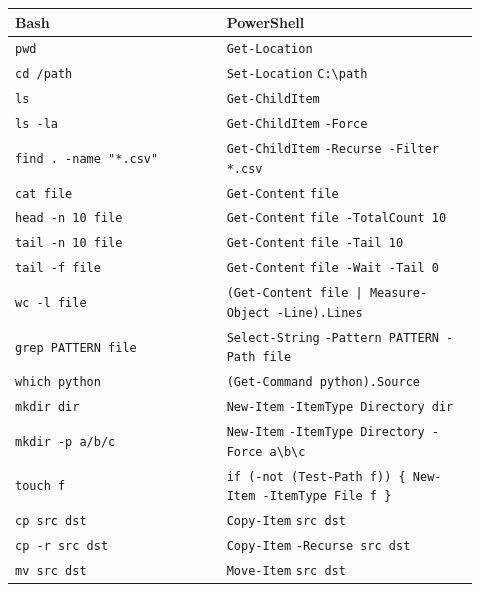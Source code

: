 \documentclass[11pt,a4paper]{article}
\newcommand{\cmd}[1]{\texttt{\textcolor{pwshKw}{#1}}}
\newcommand{\bcmd}[1]{\texttt{\textcolor{bashKw}{#1}}}
\begin{document}
\begin{center}
\renewcommand{\arraystretch}{1.15}
\begin{tabular}{p{0.42\linewidth} p{0.50\linewidth}}
\toprule
\textbf{Bash} & \textbf{PowerShell} \\
\midrule
\bcmd{pwd}                              & \cmd{Get-Location} \\
\bcmd{cd /path}                          & \cmd{Set-Location} \texttt{C:\textbackslash{}path} \\
\bcmd{ls}                                & \cmd{Get-ChildItem} \\
\bcmd{ls -la}                            & \cmd{Get-ChildItem} \texttt{-Force} \\
\bcmd{find . -name "*.csv"}              & \cmd{Get-ChildItem} \texttt{-Recurse -Filter *.csv} \\
\bcmd{cat file}                          & \cmd{Get-Content} \texttt{file} \\
\bcmd{head -n 10 file}                   & \cmd{Get-Content} \texttt{file -TotalCount 10} \\
\bcmd{tail -n 10 file}                   & \cmd{Get-Content} \texttt{file -Tail 10} \\
\bcmd{tail -f file}                      & \cmd{Get-Content} \texttt{file -Wait -Tail 0} \\
\bcmd{wc -l file}                        & \texttt{(\cmd{Get-Content} file | \cmd{Measure-Object} -Line).Lines} \\
\bcmd{grep PATTERN file}                 & \cmd{Select-String} \texttt{-Pattern PATTERN -Path file} \\
\bcmd{which python}                      & \texttt{(\cmd{Get-Command} python).Source} \\
\bcmd{mkdir dir}                         & \cmd{New-Item} \texttt{-ItemType Directory dir} \\
\bcmd{mkdir -p a/b/c}                    & \cmd{New-Item} \texttt{-ItemType Directory -Force a\textbackslash{}b\textbackslash{}c} \\
\bcmd{touch f}                           & \texttt{if (-not (Test-Path f)) \{ \cmd{New-Item} -ItemType File f \}} \\
\bcmd{cp src dst}                        & \cmd{Copy-Item} \texttt{src dst} \\
\bcmd{cp -r src dst}                     & \cmd{Copy-Item} \texttt{-Recurse src dst} \\
\bcmd{mv src dst}                        & \cmd{Move-Item} \texttt{src dst} \\

\end{tabular}
\end{center}
\end{document}
